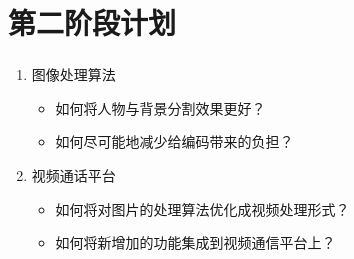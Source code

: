 \documentclass[xcolor=dvipsnames]{beamer}
\begin{document}
\section{第二阶段计划}
\begin{frame}
  \frametitle{}
  \begin{enumerate}
    \item 图像处理算法
    \begin{itemize}
      \item 如何将人物与背景分割效果更好？
      \item 如何尽可能地减少给编码带来的负担？
    \end{itemize}
    \item 视频通话平台
    \begin{itemize}
      \item 如何将对图片的处理算法优化成视频处理形式？
      \item 如何将新增加的功能集成到视频通信平台上？
    \end{itemize}
  \end{enumerate}
  

\end{frame}
\end{document}
